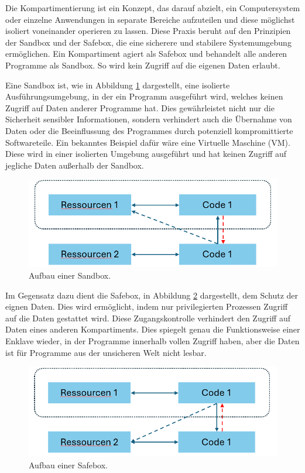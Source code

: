 Die Kompartimentierung ist ein Konzept, das darauf abzielt, ein Computersystem oder einzelne Anwendungen in separate Bereiche aufzuteilen und diese möglichst isoliert voneinander operieren zu lassen. Diese Praxis beruht auf den Prinzipien der Sandbox und der Safebox, die eine sicherere und stabilere Systemumgebung ermöglichen\cite{CIVPaper}. Ein Kompartiment agiert als Safebox und behandelt alle anderen Programme als Sandbox. So wird kein Zugriff auf die eigenen Daten erlaubt.

Eine Sandbox ist, wie in Abbildung \ref{fig:Sandbox} dargestellt, eine isolierte Ausführungsumgebung, in der ein Programm ausgeführt wird, welches keinen Zugriff auf Daten anderer Programme hat. 
Dies gewährleistet nicht nur die Sicherheit sensibler Informationen, sondern verhindert auch die Übernahme von Daten oder die Beeinflussung des Programmes durch potenziell kompromittierte Softwareteile. 
Ein bekanntes Beispiel dafür wäre eine Virtuelle Maschine (VM). Diese wird in einer isolierten Umgebung ausgeführt und hat keinen Zugriff auf jegliche Daten außerhalb der Sandbox.

\begin{figure}[h]
    \centering
    \includegraphics[width=0.8\linewidth]{Grafiken/Sandbox.png}
    \caption{Aufbau einer Sandbox.}
    \label{fig:Sandbox}
\end{figure}

Im Gegensatz dazu dient die Safebox, in Abbildung \ref{fig:Safebox} dargestellt, dem Schutz der eignen Daten. Dies wird ermöglicht, indem nur privilegierten Prozessen Zugriff auf die Daten gestattet wird. Diese Zugangskontrolle verhindert den Zugriff auf Daten eines anderen Kompartiments. 
Dies spiegelt genau die Funktionsweise einer Enklave wieder, in der Programme innerhalb vollen Zugriff haben, aber die Daten ist für Programme aus der unsicheren Welt nicht lesbar.
\begin{figure}[h]
    \centering
    \includegraphics[width=0.8\linewidth]{Grafiken/Safebox.png}
    \caption{Aufbau einer Safebox.}
    \label{fig:Safebox}
\end{figure}

